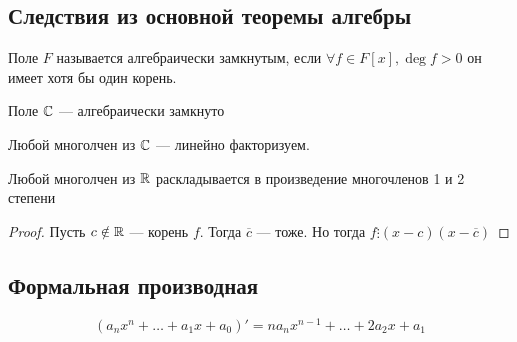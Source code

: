 \subsection{Следствия из основной теоремы алгебры}
\begin{definition}
    Поле \(F\) называется алгебраически замкнутым, если \(\forall f \in F[x], \deg f > 0\) он имеет хотя бы один корень.
\end{definition}
\begin{corollary}
    Поле \(\mathbb{C}\) --- алгебраически замкнуто
\end{corollary}
\begin{corollary}
    Любой многолчен из \(\mathbb{C}\) --- линейно факторизуем.
\end{corollary}
\begin{corollary}
    Любой многолчен из \(\mathbb{R}\) раскладывается в произведение многочленов 1 и 2 степени
\end{corollary}
\begin{proof}
    Пусть \(c \notin \mathbb{R}\) --- корень \(f\). Тогда \(\overline{c}\) --- тоже. Но тогда \(f \vdots (x - c)(x - \overline{c})\)
\end{proof}

\subsection{Формальная производная}
\begin{definition}
    \[(a_nx^n + \dots + a_1x + a_0)' = na_nx^{n-1} + \dots + 2a_2x + a_1\]
\end{definition}